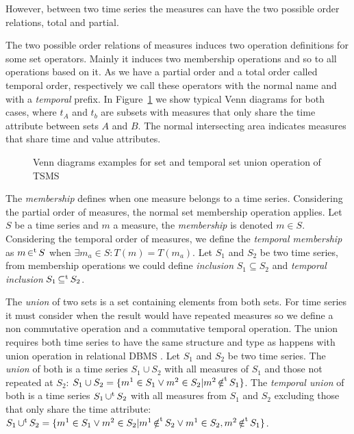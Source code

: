 
However, between two time series the measures can have the two possible order relations, total and partial.

The two possible order relations of measures induces two operation
definitions for some set operators. Mainly it induces two membership
operations and so to all operations based on it. As we have a partial
order and a total order called temporal order, respectively we call
these operators with the normal name and with a \emph{temporal}
prefix. In Figure~\ref{fig:model:venn} we show typical Venn diagrams
for both cases, where $t_A$ and $t_b$ are subsets with measures that
only share the time attribute between sets $A$ and $B$. The normal
intersecting area indicates measures that share time and value
attributes.

\begin{figure}
  \centering
  
  \caption{Venn diagrams examples for set and temporal set union
    operation of TSMS}
  \label{fig:model:venn}
\end{figure}


The \emph{membership} defines when one measure belongs to a time
series. Considering the partial order of measures, the normal set
membership operation applies. Let $S$ be a time series and $m$ a
measure, the \emph{membership} is denoted $m \in S$. Considering the
temporal order of measures, we define the \emph{temporal membership}
as $m \operatorname*{\in^t} S$ when $\exists m_a \in S : T(m) = T(m_a)$.  Let $S_1$
and $S_2$ be two time series, from membership operations we could
define \emph{inclusion} $S_1\subseteq S_2$ and \emph{temporal
  inclusion} $S_1\operatorname*{\subseteq^t} S_2$.




The \emph{union} of two sets is a set containing elements from both
sets. For time series it must consider when the result would have
repeated measures so we define a non commutative operation and a
commutative temporal operation. The union requires both time series to
have the same structure and type as happens with union operation in
relational DBMS \cite{date:introduction}. %
Let $S_1$ and $S_2$ be two time series. The \emph{union} of both is a
time series $S_1 \cup S_2$ with all measures of $S_1$ and those not
repeated at $S_2$: $S_1 \cup S_2 = \{m^1 \in S_1 \vee m^2 \in S_2 |
m^2 \operatorname*{\notin^t} S_1 \}$. The \emph{temporal union} of both is a time
series $S_1 \operatorname*{\cup^t} S_2$ with all measures from $S_1$ and $S_2$
excluding those that only share the time attribute: $S_1 \operatorname*{\cup^t} S_2 =
\{ m^1 \in S_1 \vee m^2 \in S_2 | m^1 \operatorname*{\notin^t} S_2 \vee m^1 \in S_2,
m^2 \operatorname*{\notin^t} S_1 \}$.



